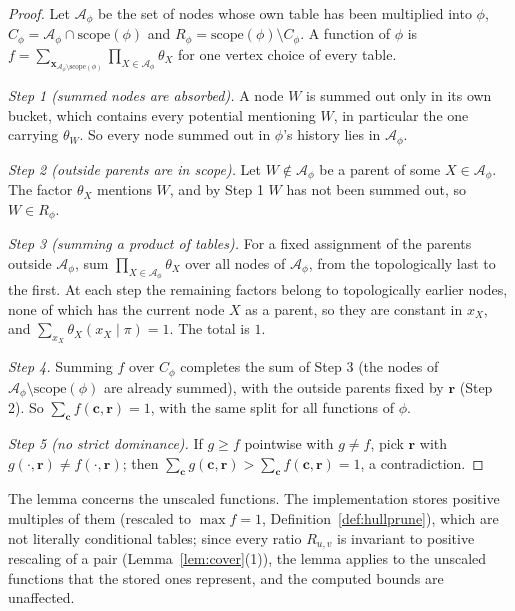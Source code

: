 \documentclass{article} %
\newcommand{\scope}{\mathrm{scope}}
\begin{document}
\begin{proof}
Let $\mathcal A_\phi$ be the set of nodes whose own table has been multiplied into $\phi$,
$C_\phi=\mathcal A_\phi\cap\scope(\phi)$ and $R_\phi=\scope(\phi)\setminus C_\phi$. A
function of $\phi$ is $f=\sum_{\mathbf x_{\mathcal A_\phi\setminus\scope(\phi)}}
\prod_{X\in\mathcal A_\phi}\theta_X$ for one vertex choice of every table.

\emph{Step 1 (summed nodes are absorbed).} A node $W$ is summed out only in its own bucket,
which contains every potential mentioning $W$, in particular the one carrying $\theta_W$.
So every node summed out in $\phi$'s history lies in $\mathcal A_\phi$.

\emph{Step 2 (outside parents are in scope).} Let $W\notin\mathcal A_\phi$ be a parent of
some $X\in\mathcal A_\phi$. The factor $\theta_X$ mentions $W$, and by Step 1 $W$ has not
been summed out, so $W\in R_\phi$.

\emph{Step 3 (summing a product of tables).} For a fixed assignment of the parents outside
$\mathcal A_\phi$, sum $\prod_{X\in\mathcal A_\phi}\theta_X$ over all nodes of $\mathcal
A_\phi$, from the topologically last to the first. At each step the remaining factors
belong to topologically earlier nodes, none of which has the current node $X$ as a parent,
so they are constant in $x_X$, and $\sum_{x_X}\theta_X(x_X\mid\pi)=1$. The total is $1$.

\emph{Step 4.} Summing $f$ over $C_\phi$ completes the sum of Step 3 (the nodes of
$\mathcal A_\phi\setminus\scope(\phi)$ are already summed), with the outside parents fixed by
$\mathbf r$ (Step 2). So $\sum_{\mathbf c}f(\mathbf c,\mathbf r)=1$, with the same split for
all functions of $\phi$.

\emph{Step 5 (no strict dominance).} If $g\ge f$ pointwise with $g\ne f$, pick $\mathbf r$
with $g(\cdot,\mathbf r)\ne f(\cdot,\mathbf r)$; then
$\sum_{\mathbf c}g(\mathbf c,\mathbf r)>\sum_{\mathbf c}f(\mathbf c,\mathbf r)=1$,
a contradiction.
\end{proof}

The lemma concerns the unscaled functions. The implementation stores positive multiples
of them (rescaled to $\max f=1$, Definition~\ref{def:hullprune}), which are not literally
conditional tables; since every ratio $R_{u,v}$ is invariant to positive rescaling of a
pair (Lemma~\ref{lem:cover}(1)), the lemma applies to the unscaled functions that the stored
ones represent, and the computed bounds are unaffected.

\end{document}
